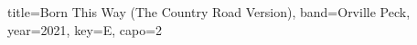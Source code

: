 \documentclass{skrul-leadsheet}
\begin{document}
\begin{song}[transpose-capo=true]{title={Born This Way (The Country Road Version)}, band={Orville Peck}, year={2021}, key={E}, capo={2}}



\end{song}
\end{document}
